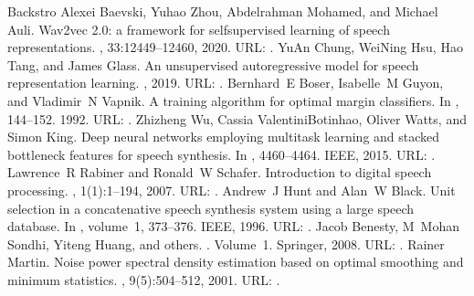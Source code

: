 \documentclass[letterpaper,10pt,english]{jupyterBook}
\begin{document}
\begin{sphinxthebibliography}{Backstro}
\sphinxAtStartPar
Alexei Baevski, Yuhao Zhou, Abdelrahman Mohamed, and Michael Auli. Wav2vec 2.0: a framework for self\sphinxhyphen{}supervised learning of speech representations. , 33:12449–12460, 2020. URL: .
\sphinxAtStartPar
Yu\sphinxhyphen{}An Chung, Wei\sphinxhyphen{}Ning Hsu, Hao Tang, and James Glass. An unsupervised autoregressive model for speech representation learning. , 2019. URL: .
\sphinxAtStartPar
Bernhard E Boser, Isabelle M Guyon, and Vladimir N Vapnik. A training algorithm for optimal margin classifiers. In , 144–152. 1992. URL: .
\sphinxAtStartPar
Zhizheng Wu, Cassia Valentini\sphinxhyphen{}Botinhao, Oliver Watts, and Simon King. Deep neural networks employing multi\sphinxhyphen{}task learning and stacked bottleneck features for speech synthesis. In , 4460–4464. IEEE, 2015. URL: .
\sphinxAtStartPar
Lawrence R Rabiner and Ronald W Schafer. Introduction to digital speech processing. , 1(1):1–194, 2007. URL: .
\sphinxAtStartPar
Andrew J Hunt and Alan W Black. Unit selection in a concatenative speech synthesis system using a large speech database. In , volume 1, 373–376. IEEE, 1996. URL: .
\sphinxAtStartPar
Jacob Benesty, M Mohan Sondhi, Yiteng Huang, and others. . Volume 1. Springer, 2008. URL: .
\sphinxAtStartPar
Rainer Martin. Noise power spectral density estimation based on optimal smoothing and minimum statistics. , 9(5):504–512, 2001. URL: .

\end{sphinxthebibliography}
\end{document}
